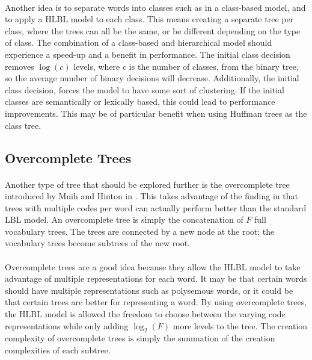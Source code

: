 \paragraph{}
Another idea is to separate words into classes such as in a class-based model, and to apply a HLBL model to each class. This means creating a separate tree per class, where the trees can all be the same, or be different depending on the type of class. The combination of a class-based and hierarchical model should experience a speed-up and a benefit in performance. The initial class decision removes $\log(c)$ levels, where c is the number of classes, from the binary tree, so the average number of binary decisions will decrease. Additionally, the initial class decision, forces the model to have some sort of clustering. If the initial classes are semantically or lexically based, this could lead to performance improvements. This may be of particular benefit when using Huffman trees as the class tree.


\subsection{Overcomplete Trees}
\paragraph{}
Another type of tree that should be explored further is the overcomplete tree introduced by Mnih and Hinton in \cite{MnihHinton2009}. This takes advantage of the finding in \cite{MnihHinton2009} that trees with multiple codes per word can actually perform better than the standard LBL model. An overcomplete tree is simply the concatenation of $F$ full vocabulary trees. The trees are connected by a new node at the root; the vocabulary trees become subtrees of the new root. 
\paragraph{}
Overcomplete trees are a good idea because they allow the HLBL model to take advantage of multiple representations for each word. It may be that certain words should have multiple representations such as polysemous words, or it could be that certain trees are better for representing a word. By using overcomplete trees, the HLBL model is allowed the freedom to choose between the varying code representations while only adding $\log_2(F)$ more levels to the tree. The creation complexity of overcomplete trees is simply the summation of the creation complexities of each subtree.

